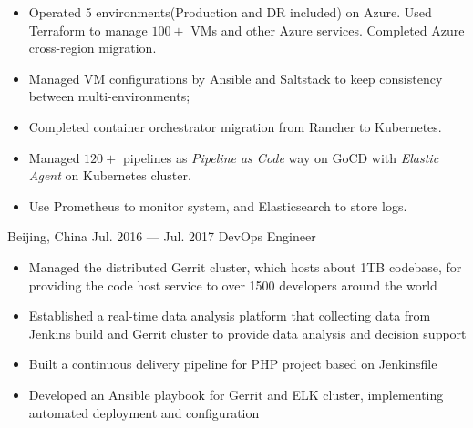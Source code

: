 \documentclass{resume}
\begin{document}
\begin{body}
\begin{itemize}
\begin{itemize}[noitemsep,topsep=0pt]
			\item Operated 5 environments(Production and DR included) on Azure. Used Terraform to manage $100+$ VMs and other Azure services. Completed Azure cross-region migration.
			\item Managed VM configurations by Ansible and Saltstack to keep consistency between multi-environments;
			\item Completed container orchestrator migration from Rancher to Kubernetes.
			\item Managed $120+$ pipelines as \textit{Pipeline as Code} way on GoCD with \textit{Elastic Agent} on Kubernetes cluster.
			\item Use Prometheus to monitor system, and Elasticsearch to store logs.
		\end{itemize}
	\end{itemize}
\end{body}

\begin{body}
	{Beijing, China}
	{Jul. 2016 --- Jul. 2017}
	{DevOps Engineer}
	\begin{itemize}[noitemsep,topsep=0pt]
		\item Managed the distributed Gerrit cluster, which hosts about 1TB codebase, for providing the code host service to over 1500 developers around the world
		\item Established a real-time data analysis platform that collecting data from Jenkins build and Gerrit cluster to provide data analysis and decision support
		\item Built a continuous delivery pipeline for PHP project based on Jenkinsfile
		\item Developed an Ansible playbook for Gerrit and ELK cluster, implementing automated deployment and configuration
	\end{itemize}
\end{body}
\end{document}
